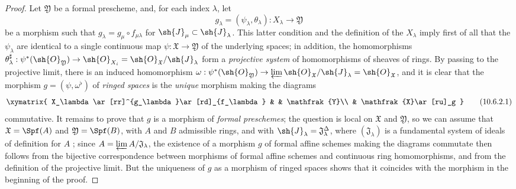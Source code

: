\begin{proof}
Let $\mathfrak{Y}$ be a formal prescheme, and, for each index $\lambda$, let
\[
  g_\lambda=(\psi_\lambda,\theta_\lambda):X_\lambda\to\mathfrak{Y}
\]
be a morphism such that $g_\lambda=g_\mu\circ f_{\mu\lambda}$ for $\sh{J}_\mu\subset\sh{J}_\lambda$.
This latter condition and the definition of the $X_\lambda$ imply first of all that the $\psi_\lambda$ are identical to a single continuous map $\psi:\mathfrak{X}\to\mathfrak{Y}$ of the underlying spaces; in addition, the homomorphisms $\theta_\lambda^\sharp:\psi^*(\sh{O}_\mathfrak{Y})\to\sh{O}_{X_i}=\sh{O}_\mathfrak{X}/\sh{J}_\lambda$ form a \emph{projective system} of homomorphisms of sheaves of rings.
By passing to the projective limit, there is an induced homomorphism $\omega:\psi^*(\sh{O}_\mathfrak{Y})\to\varprojlim\sh{O}_\mathfrak{X}/\sh{J}_\lambda=\sh{O}_\mathfrak{X}$, and it is clear that the morphism $g=(\psi,\omega^\flat)$ of \emph{ringed spaces} is the \emph{unique} morphism making the diagrams
\[
\label{I.10.6.2.1}
  \xymatrix{
    X_\lambda\ar[rr]^{g_\lambda}\ar[rd]_{f_\lambda} & &
    \mathfrak{Y}\\
    & \mathfrak{X}\ar[ru]_g
  }
  \tag{10.6.2.1}
\]
commutative.
It remains to prove that $g$ is a morphism of \emph{formal preschemes}; the question is local on $\mathfrak{X}$ and $\mathfrak{Y}$, so we can assume that $\mathfrak{X}=\Spf(A)$ and $\mathfrak{Y}=\Spf(B)$, with $A$ and $B$ admissible rings, and with $\sh{J}_\lambda=\mathfrak{J}_\lambda^\Delta$, where $(\mathfrak{J}_\lambda)$ is a fundamental system of ideals of definition for $A$ ; since $A=\varprojlim A/\mathfrak{J}_\lambda$, the existence of a morphism $g$ of formal affine schemes making the diagrams  commutate then follows from the bijective correspondence  between morphisms of formal affine schemes and continuous ring homomorphisms, and from the definition of the projective limit.
But the uniqueness of $g$ as a morphism of ringed spaces shows that it coincides with the morphism in the beginning of the proof.
\end{proof}

